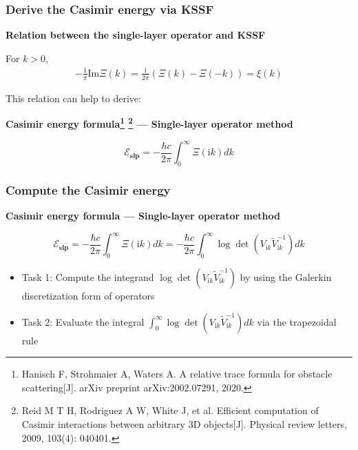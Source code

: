\documentclass[dvipsnames,10pt]{beamer}
\begin{document}
\begin{frame}
    \frametitle{Derive the Casimir energy via KSSF}
      \begin{tcolorbox}
    \textbf{Relation between the single-layer operator and KSSF}
    
        For $k>0$,
        \begin{align*}
        -\frac{1}{\pi}\text{Im}\Xi(k) = \frac{\mathrm{i}}{2\pi}(\Xi(k) - \Xi(-k)) = \xi(k)
    \end{align*}
    \end{tcolorbox}
    This relation can help to derive:
    \begin{tcolorbox}
    \textbf{Casimir energy formula\footnote{Hanisch F, Strohmaier A, Waters A. A relative trace formula for obstacle scattering[J]. arXiv preprint arXiv:2002.07291, 2020.} \footnote{Reid M T H, Rodriguez A W, White J, et al. Efficient computation of Casimir interactions between arbitrary 3D objects[J]. Physical review letters, 2009, 103(4): 040401.} ---
    Single-layer operator method}
   
    
    $$\mathcal{E}_{\textbf{slp}} =  -\frac{\hbar c}{2\pi}\int_{0}^{\infty}\Xi(\mathrm{i}k)dk$$
\end{tcolorbox}
\end{frame}
\begin{frame}
    \frametitle{Compute the Casimir energy}
    \begin{tcolorbox}
\textbf{Casimir energy formula ---
    Single-layer operator method}
    
    $$\mathcal{E}_{\textbf{slp}} =  -\frac{\hbar c}{2\pi}\int_{0}^{\infty}\Xi(\mathrm{i}k)dk = -\frac{\hbar c}{2\pi}\int_{0}^{\infty}\log\det\left(V_{\mathrm{i}k}\tilde{V}_{\mathrm{i}k}^{-1}\right)dk$$
\end{tcolorbox}

\begin{itemize}
    \item Task 1: Compute the integrand $\log\det\left(V_{\mathrm{i}k}\tilde{V}_{\mathrm{i}k}^{-1}\right)$ by using the Galerkin discretization form of operators
    \vspace{0.3cm}
    \item Task 2: Evaluate the integral $\int_{0}^{\infty}\log\det\left(V_{\mathrm{i}k}\tilde{V}_{\mathrm{i}k}^{-1}\right)dk$ via the trapezoidal rule
\end{itemize}


\end{frame}
\end{document}

